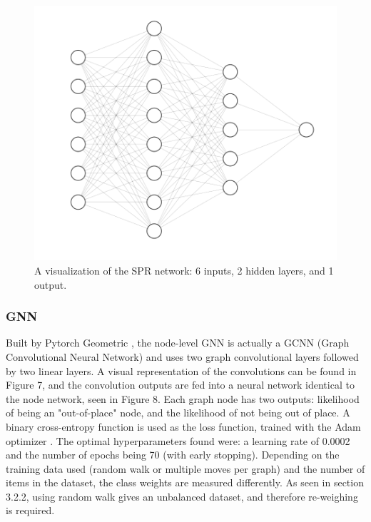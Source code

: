 \documentclass{mpaper}
\begin{document}
\begin{figure}
    \includegraphics[width=1\linewidth]{dissertation/images/spr_nn.png}
    \centering
    \caption{A visualization of the SPR network: 6 inputs, 2 hidden layers, and 1 output.}
\end{figure}


\subsubsection{GNN}

Built by Pytorch Geometric \cite{fey2019fast}, the node-level GNN is actually a GCNN (Graph Convolutional Neural Network) and uses two graph convolutional layers followed by two linear layers. A visual representation of the convolutions can be found in Figure 7, and the convolution outputs are fed into a neural network identical to the node network, seen in Figure 8. Each graph node has two outputs: likelihood of being an "out-of-place" node, and the likelihood of not being out of place. A binary cross-entropy function is used as the loss function, trained with the Adam optimizer \cite{kingma2014adam}. The optimal hyperparameters found were: a learning rate of 0.0002 and the number of epochs being 70 (with early stopping). Depending on the training data used (random walk or multiple moves per graph) and the number of items in the dataset, the class weights are measured differently. As seen in section 3.2.2, using random walk gives an unbalanced dataset, and therefore re-weighing is required.
\end{document}
